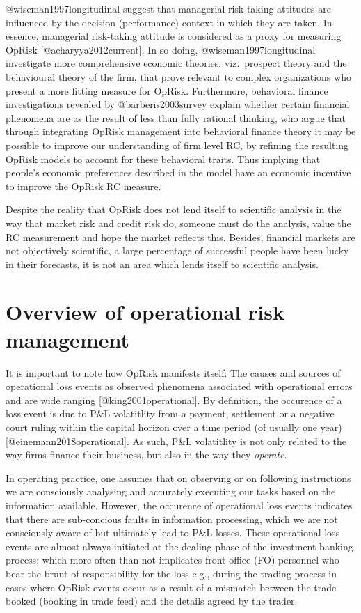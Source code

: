 \documentclass[]{article}
\begin{document}
@wiseman1997longitudinal suggest that managerial risk-taking attitudes
are influenced by the decision (performance) context in which they are
taken. In essence, managerial risk-taking attitude is considered as a
proxy for measuring OpRisk {[}@acharyya2012current{]}. In so doing,
@wiseman1997longitudinal investigate more comprehensive economic
theories, viz.~prospect theory and the behavioural theory of the firm,
that prove relevant to complex organizations who present a more fitting
measure for OpRisk. Furthermore, behavioral finance investigations
revealed by @barberis2003survey explain whether certain financial
phenomena are as the result of less than fully rational thinking, who
argue that through integrating OpRisk management into behavioral finance
theory it may be possible to improve our understanding of firm level RC,
by refining the resulting OpRisk models to account for these behavioral
traits. Thus implying that people's economic preferences described in
the model have an economic incentive to improve the OpRisk RC measure.
\medskip

Despite the reality that OpRisk does not lend itself to scientific
analysis in the way that market risk and credit risk do, someone must do
the analysis, value the RC measurement and hope the market reflects
this. Besides, financial markets are not objectively scientific, a large
percentage of successful people have been lucky in their forecasts, it
is not an area which lends itself to scientific analysis.

\section{Overview of operational risk management}
\label{sec:Overview of operational risk management}

It is important to note how OpRisk manifests itself: The causes and
sources of operational loss events as observed phenomena associated with
operational errors and are wide ranging {[}@king2001operational{]}. By
definition, the occurence of a loss event is due to P\&L volatitlity
from a payment, settlement or a negative court ruling within the capital
horizon over a time period (of usually one year)
{[}@einemann2018operational{]}. As such, P\&L volatitlity is not only
related to the way firms finance their business, but also in the way
they \emph{operate}.\medskip 

In operating practice, one assumes that on observing or on following
instructions we are consciously analysing and accurately executing our
tasks based on the information available. However, the occurence of
operational loss events indicates that there are sub-concious faults in
information processing, which we are not consciously aware of but
ultimately lead to P\&L losses. These operational loss events are almost
always initiated at the dealing phase of the investment banking process;
which more often than not implicates front office (FO) personnel who
bear the brunt of responsibility for the loss e.g., during the trading
process in cases where OpRisk events occur as a result of a mismatch
between the trade booked (booking in trade feed) and the details agreed
by the trader.\medskip
\end{document}
